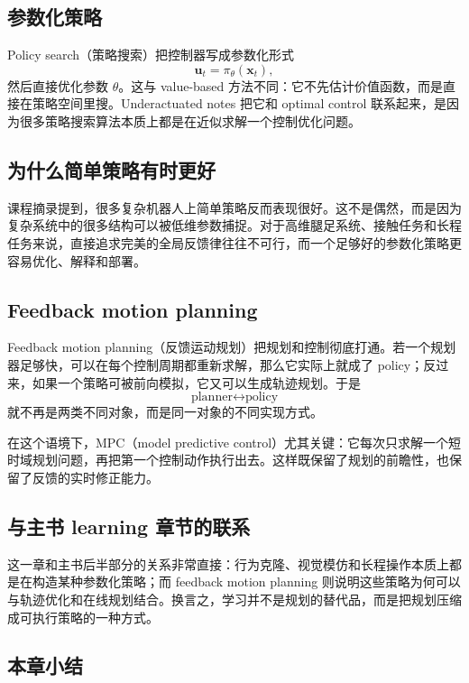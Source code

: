 \documentclass[a4paper]{article}
\newcommand{\bx}{\mathbf{x}}
\newcommand{\bu}{\mathbf{u}}
\begin{document}
\subsection{参数化策略}

Policy search（策略搜索）把控制器写成参数化形式
\[
\bu_t = \pi_\theta(\bx_t),
\]
然后直接优化参数 $\theta$。这与 value-based 方法不同：它不先估计价值函数，而是直接在策略空间里搜。Underactuated notes 把它和 optimal control 联系起来，是因为很多策略搜索算法本质上都是在近似求解一个控制优化问题。

\subsection{为什么简单策略有时更好}

课程摘录提到，很多复杂机器人上简单策略反而表现很好。这不是偶然，而是因为复杂系统中的很多结构可以被低维参数捕捉。对于高维腿足系统、接触任务和长程任务来说，直接追求完美的全局反馈律往往不可行，而一个足够好的参数化策略更容易优化、解释和部署。

\subsection{Feedback motion planning}

Feedback motion planning（反馈运动规划）把规划和控制彻底打通。若一个规划器足够快，可以在每个控制周期都重新求解，那么它实际上就成了 policy；反过来，如果一个策略可被前向模拟，它又可以生成轨迹规划。于是
\[
\text{planner} \leftrightarrow \text{policy}
\]
就不再是两类不同对象，而是同一对象的不同实现方式。

在这个语境下，MPC（model predictive control）尤其关键：它每次只求解一个短时域规划问题，再把第一个控制动作执行出去。这样既保留了规划的前瞻性，也保留了反馈的实时修正能力。

\subsection{与主书 learning 章节的联系}

这一章和主书后半部分的关系非常直接：行为克隆、视觉模仿和长程操作本质上都是在构造某种参数化策略；而 feedback motion planning 则说明这些策略为何可以与轨迹优化和在线规划结合。换言之，学习并不是规划的替代品，而是把规划压缩成可执行策略的一种方式。

\subsection{本章小结}
\end{document}
